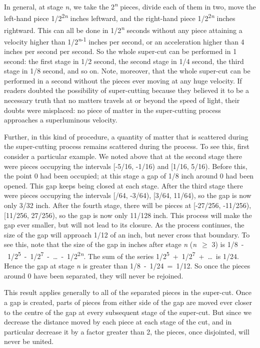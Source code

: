 \documentclass[
  11pt,
  letterpaper,
  DIV=11,
  numbers=noendperiod,
  twoside]{scrartcl}
\begin{document}
In general, at stage \emph{n}, we take the 2\textsuperscript{\emph{n}}
pieces, divide each of them in two, move the left-hand piece
1/2\textsuperscript{2\emph{n}} inches leftward, and the right-hand piece
1/2\textsuperscript{2\emph{n}} inches rightward. This can all be done in
1/2\textsuperscript{\emph{n}} seconds without any piece attaining a
velocity higher than 1/2\textsuperscript{\emph{n}-1} inches per second,
or an acceleration higher than 4 inches per second per second. So the
whole super-cut can be performed in 1 second: the first stage in 1/2
second, the second stage in 1/4 second, the third stage in 1/8 second,
and so on. Note, moreover, that the whole super-cut can be performed in
a second without the pieces ever moving at any huge velocity. If readers
doubted the possibility of super-cutting because they believed it to be
a necessary truth that no matters travels at or beyond the speed of
light, their doubts were misplaced: no piece of matter in the
super-cutting process approaches a superluminous velocity.

Further, in this kind of procedure, a quantity of matter that is
scattered during the super-cutting process remains scattered during the
process. To see this, first consider a particular example. We noted
above that at the second stage there were pieces occupying the intervals
{[}-5/16, -1/16) and {[}1/16, 5/16). Before this, the point 0 had been
occupied; at this stage a gap of 1/8 inch around 0 had been opened. This
gap keeps being closed at each stage. After the third stage there were
pieces occupying the intervals {[}/64, -3/64), {[}3/64, 11/64), so the
gap is now only 3/32 inch. After the fourth stage, there will be pieces
at {[}-27/256, -11/256), {[}11/256, 27/256), so the gap is now only
11/128 inch. This process will make the gap ever smaller, but will not
lead to its closure. As the process continues, the size of the gap will
approach 1/12 of an inch, but never cross that boundary. To see this,
note that the size of the gap in inches after stage \emph{n}
(\emph{n}~\({\geq}\) 3) is
1/8~-~1/2\textsuperscript{5}~-~1/2\textsuperscript{7}~-~\ldots~-~1/2\textsuperscript{2\emph{n}}.
The sum of the series
1/2\textsuperscript{5}~+~1/2\textsuperscript{7}~+~\ldots~is 1/24. Hence
the gap at stage \emph{n} is greater than 1/8~-~1/24~=~1/12. So once the
pieces around 0 have been separated, they will never be rejoined.

This result applies generally to all of the separated pieces in the
super-cut. Once a gap is created, parts of pieces from either side of
the gap are moved ever closer to the centre of the gap at every
subsequent stage of the super-cut. But since we decrease the distance
moved by each piece at each stage of the cut, and in particular decrease
it by a factor greater than 2, the pieces, once disjointed, will never
be united.
\end{document}

